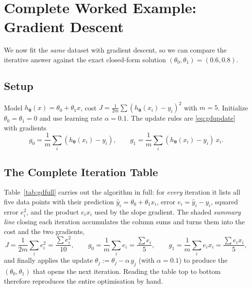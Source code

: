 \documentclass[11pt,a4paper]{report}
\theoremstyle{definition}
\theoremstyle{plain}
\theoremstyle{remark}
\newcommand{\htheta}{h_{\bm{\theta}}}
\begin{document}
	\chapter{Complete Worked Example: Gradient Descent}
	\label{ch:gdexample}
	
	We now fit the \emph{same} dataset with gradient descent, so we can compare the
	iterative answer against the exact closed-form solution
	$(\theta_0,\theta_1)=(0.6,0.8)$.
	
	\section{Setup}
	Model $\htheta(x)=\theta_0+\theta_1x$, cost
	$J=\frac{1}{2m}\sum(\htheta(x_i)-y_i)^2$ with $m=5$. Initialize
	$\theta_0=\theta_1=0$ and use learning rate $\alpha=0.1$. The update rules are
	\eqref{eq:gdupdate} with gradients
	\[
	g_0=\frac1m\sum_i(\htheta(x_i)-y_i),\qquad
	g_1=\frac1m\sum_i(\htheta(x_i)-y_i)\,x_i .
	\]
	
	\section{The Complete Iteration Table}
	Table~\ref{tab:gdfull} carries out the algorithm in full: for \emph{every}
	iteration it lists all five data points with their prediction
	$\hat y_i=\theta_0+\theta_1 x_i$, error $e_i=\hat y_i-y_i$, squared error
	$e_i^2$, and the product $e_i x_i$ used by the slope gradient. The shaded
	\emph{summary line} closing each iteration accumulates the column sums and
	turns them into the cost and the two gradients,
	\[
	J=\frac{1}{2m}\sum_i e_i^2=\frac{\sum e_i^2}{10},\qquad
	g_0=\frac{1}{m}\sum_i e_i=\frac{\sum e_i}{5},\qquad
	g_1=\frac{1}{m}\sum_i e_i x_i=\frac{\sum e_i x_i}{5},
	\]
	and finally applies the update
	$\theta_j:=\theta_j-\alpha\,g_j$ (with $\alpha=0.1$) to produce the
	$(\theta_0,\theta_1)$ that opens the next iteration. Reading the table top to
	bottom therefore reproduces the entire optimisation by hand.
	
\end{document}
